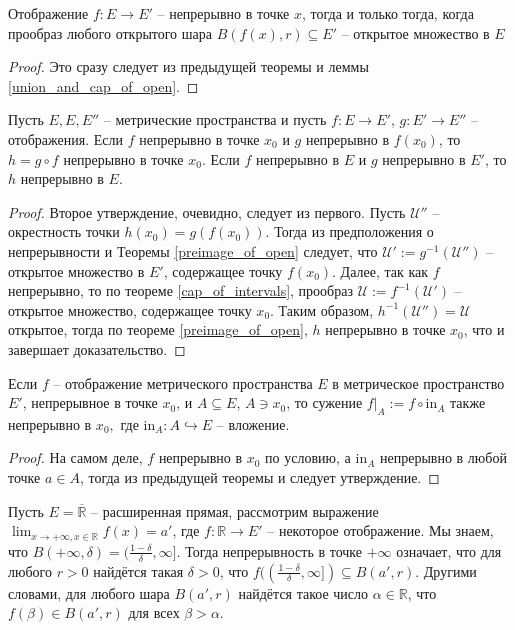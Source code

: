 \begin{corollary}
    Отображение $f:E \to E'$ -- непрерывно в точке $x$, тогда и только тогда, когда прообраз любого открытого шара $B(f(x),r) \subseteq E'$ -- открытое множество в $E$
\end{corollary}
\begin{proof}
    Это сразу следует из предыдущей теоремы и леммы \ref{union_and_cap_of_open}.
\end{proof}

\begin{theorem}\label{comp_of_continous}
    Пусть $E,E,E''$ -- метрические пространства и пусть $f:E \to E'$, $g:E' \to E''$ -- отображения. Если $f$ непрерывно в точке $x_0$ и $g$ непрерывно в $f(x_0)$, то $h = g \circ f$ непрерывно в точке $x_0.$ Если $f$ непрерывно в $E$ и $g$ непрерывно в $E'$, то $h$ непрерывно в $E.$
\end{theorem}
 \begin{proof}
     Второе утверждение, очевидно, следует из первого. Пусть $\mathscr{U}''$ -- окрестность точки $h(x_0) =  g(f(x_0))$. Тогда из предположения о непрерывности и Теоремы \ref{preimage_of_open} следует, что $\mathscr{U}':=g^{-1}(\mathscr{U}'')$ -- открытое множество в $E'$, содержащее точку $f(x_0)$. Далее, так как $f$ непрерывно, то по теореме \ref{cap_of_intervals}, прообраз $\mathscr{U}:=f^{-1}(\mathscr{U}')$ -- открытое множество, содержащее точку $x_0$. Таким образом, $h^{-1}(\mathscr{U}'') = \mathscr{U}$ открытое, тогда по теореме \ref{preimage_of_open}, $h$ непрерывно в точке $x_0$, что и завершает доказательство. 
 \end{proof}


\begin{corollary}\label{restriction}
    Если $f$ -- отображение метрического пространства $E$ в метрическое пространство $E'$, непрерывное в точке $x_0$, и $A \subseteq E$, $A \ni x_0$, то сужение $f|_A:=f \circ \mathrm{in}_A$ также непрерывно в $x_0,$ где $\mathrm{in}_A:A \hookrightarrow E$ -- вложение.
\end{corollary}
\begin{proof}
    На самом деле, $f$ непрерывно в $x_0$ по условию, а $\mathrm{in}_A$ непрерывно в любой точке $a \in A$, тогда из предыдущей теоремы и следует утверждение.
\end{proof}

 \begin{remark}\label{+infty}
    Пусть $E = \overline{\mathbb{R}}$ -- расширенная прямая, рассмотрим выражение $\lim_{x \to +\infty, x \in \mathbb{{R}}}f(x) = a'$, где $f:\mathbb{R} \to E' $ -- некоторое отображение. Мы знаем, что $B(+\infty, \delta) = (\frac{1-\delta}{\delta}, \infty]$. Тогда непрерывность в точке $+\infty$ означает, что для любого $r >0$ найдётся такая $\delta>0$, что $f((\frac{1-\delta}{\delta}, \infty]) \subseteq B(a',r)$. Другими словами, для любого шара $B(a',r)$ найдётся такое число $\alpha \in \mathbb{R}$, что $f(\beta) \in B(a',r)$ для всех $\beta > \alpha.$
\end{remark}

